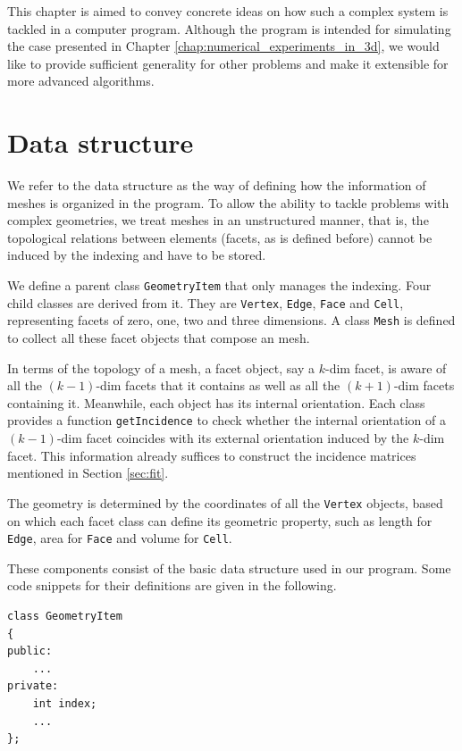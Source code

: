 \documentclass{report}
\begin{document}
\begin{appendices}
This chapter is aimed to convey concrete ideas on how such a complex system is tackled in a computer program. Although the program is intended for simulating the case presented in Chapter \ref{chap:numerical_experiments_in_3d}, we would like to provide sufficient generality for other problems and make it extensible for more advanced algorithms.     

\section{Data structure}
We refer to the data structure as the way of defining how the information of meshes is organized in the program. To allow the ability to tackle problems with complex geometries, we treat meshes in an unstructured manner, that is, the topological relations between elements (facets, as is defined before) cannot be induced by the indexing and have to be stored.  

We define a parent class \texttt{GeometryItem} that only manages the indexing. Four child classes are derived from it. They are \texttt{Vertex}, \texttt{Edge}, \texttt{Face} and \texttt{Cell}, representing facets of zero, one, two and three dimensions. A class \texttt{Mesh} is defined to collect all these facet objects that compose an mesh. 

In terms of the topology of a mesh, a facet object, say a $k$-dim facet, is aware of all the $(k-1)$-dim facets that it contains as well as all the $(k+1)$-dim facets containing it. Meanwhile, each object has its internal orientation. Each class provides a function \texttt{getIncidence} to check whether the internal orientation of a $(k-1)$-dim facet coincides with its external orientation induced by the $k$-dim facet. This information already suffices to construct the incidence matrices mentioned in Section \ref{sec:fit}.  

The geometry is determined by the coordinates of all the \texttt{Vertex} objects, based on which each facet class can define its geometric property, such as length for \texttt{Edge}, area for \texttt{Face} and volume for \texttt{Cell}. 

These components consist of the basic data structure used in our program. Some code snippets for their definitions are given in the following.

\begin{lstlisting}[numbers=none]
class GeometryItem
{
public:
    ...
private:
    int index;
    ...
};
\end{lstlisting}


\end{appendices}
\end{document}
